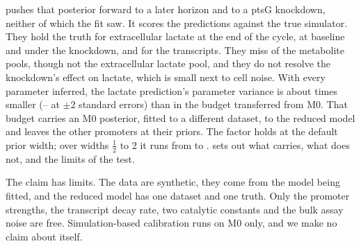  pushes that
posterior forward to a later horizon and to a ptsG knockdown, neither of which the fit saw.
It scores the predictions against the true simulator. They hold the truth for extracellular
lactate at the end of the cycle, at baseline and under the knockdown, and for the transcripts.
They miss  of the  metabolite pools, though not the
extracellular lactate pool, and they do not resolve the
knockdown's effect on lactate, which is small next to cell noise. With every parameter inferred, the lactate
prediction's parameter variance is about  times smaller (--
at $\pm 2$ standard errors) than in the budget transferred from M0. That budget carries an M0
posterior, fitted to a different dataset, to the reduced model and leaves the other promoters
at their priors. The factor holds at the default prior width; over widths $\tfrac12$ to 2 it
runs from  to .
 sets out what carries, what does not, and the limits of the test.

The claim has limits. The data are synthetic, they come from the model being fitted, and
the reduced model has one dataset and one truth. Only the promoter strengths, the
transcript decay rate, two catalytic constants and the bulk assay noise are free.
Simulation-based calibration runs on M0 only, and we make no claim about \syn{} itself.
